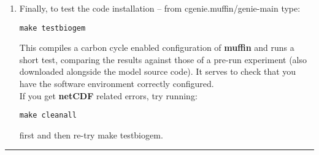 \documentclass[10pt,twoside]{article}
\begin{document}
\begin{enumerate}[noitemsep]
\begin{itemize}
\end{itemize}

\vspace{1mm}
\item Finally, to test the code installation – from \textsf{cgenie.muffin/genie-main} type:
\vspace{-2pt}
\begin{verbatim}
make testbiogem
\end{verbatim}
\vspace{-2pt}
This compiles a carbon cycle enabled configuration of \textbf{muffin} and runs a short test, comparing the results against those of a pre-run experiment (also downloaded alongside the model source code). It serves to check that you have the software environment correctly configured.
\vspace{1mm}
\\If you get \textbf{netCDF} related errors, try running:
\vspace{-2pt}
\begin{verbatim}
make cleanall
\end{verbatim}
\vspace{-2pt}
first and then re-try \textsf{make testbiogem}.

\end{enumerate}

\vspace{1mm}\noindent\rule{4cm}{0.2mm}

\end{document}
